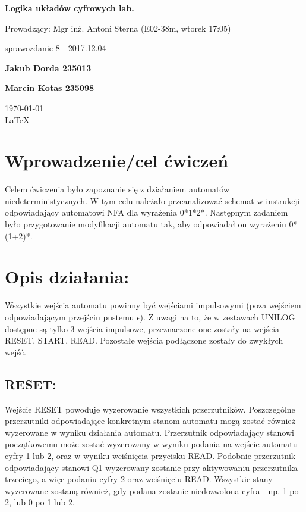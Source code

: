 \documentclass[12pt,a4paper]{article}
\begin{document}
	
	\begin{titlepage}
		
		\centering
		{\huge\bfseries Logika układów cyfrowych lab.\par}
		
		\vspace{0.5cm}
		Prowadzący: Mgr inż. Antoni Sterna (E02-38m, wtorek 17:05) \\
	
		\vspace{1.1cm}
		{\Large sprawozdanie 8 - 2017.12.04\par}
		\vfill
		
		{\large\bfseries Jakub Dorda 235013\par}
		{\large\bfseries Marcin Kotas 235098\par}
		
		\vspace{1cm}
		\today \\ \LaTeX
		
		\restoregeometry
	\end{titlepage}


	\section{Wprowadzenie/cel ćwiczeń}
	
		Celem ćwiczenia było zapoznanie się z działaniem automatów niedeterministycznych.
		W tym celu należało przeanalizować schemat w instrukcji odpowiadający automatowi NFA dla wyrażenia 0*1*2*.
		Następnym zadaniem było przygotowanie modyfikacji automatu tak, aby odpowiadał on wyrażeniu 0*(1+2)*.

	\section{Opis działania:}

			Wszystkie wejścia automatu powinny być wejściami impulsowymi (poza wejściem odpowiadającym przejściu pustemu \(\epsilon\)).
			Z uwagi na to, że w zestawach UNILOG dostępne są tylko 3 wejścia impulsowe, przeznaczone one zostały na wejścia RESET, START, READ.
			Pozostałe wejścia podłączone zostały do zwykłych wejść.

		\subsection{RESET:}
			Wejście RESET powoduje wyzerowanie wszystkich przerzutników.
			Poszczególne przerzutniki odpowiadające konkretnym stanom automatu mogą zostać również wyzerowane w wyniku działania automatu.
			Przerzutnik odpowiadający stanowi początkowemu może zostać wyzerowany w wyniku podania na wejście automatu cyfry 1 lub 2, oraz w wyniku wciśnięcia przycisku READ.
			Podobnie przerzutnik odpowiadający stanowi Q1 wyzerowany zostanie przy aktywowaniu przerzutnika trzeciego, a więc podaniu cyfry 2 oraz wciśnięciu READ.
			Wszystkie stany wyzerowane zostaną również, gdy podana zostanie niedozwolona cyfra - np. 1 po 2, lub 0 po 1 lub 2.
\end{document}
